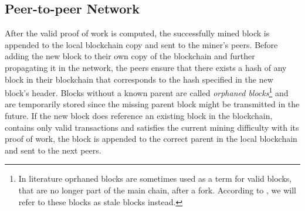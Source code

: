 \documentclass[a4paper,12pt,twoside]{report}
\begin{document}
\subsection{Peer-to-peer Network}
After the valid proof of work is computed, the successfully mined block is appended to the local blockchain copy and sent to the miner's peers. Before adding the new block to their own copy of the blockchain and further propagating it in the network, the peers ensure that there exists a hash of any block in their blockchain that corresponds to the hash specified in the new block's header. Blocks without a known parent are called \textit{orphaned blocks}\footnote{In literature oprhaned blocks are sometimes used as a term for valid blocks, that are no longer part of the main chain, after a fork. According to \cite{staleblocks}, we will refer to these blocks as stale blocks instead.} and are temporarily stored since the missing parent block might be transmitted in the future. If the new block does reference an existing block in the blockchain, contains only valid transactions and satisfies the current mining difficulty with its proof of work, the block is appended to the correct parent in the local blockchain and sent to the next peers. 
\end{document}
